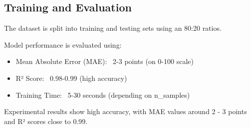\subsection{Training and Evaluation}
The dataset is split into training and testing sets using an 80:20 ratios.

Model performance is evaluated using:
\begin{itemize}
    \item Mean Absolute Error (MAE): ~2-3 points (on 0-100 scale)
    \item R² Score: ~0.98-0.99 (high accuracy)
    \item Training Time: ~5-30 seconds (depending on n\_samples)
\end{itemize}

Experimental results show high accuracy, with MAE values around 2 - 3 points and R² scores close to 0.99.

